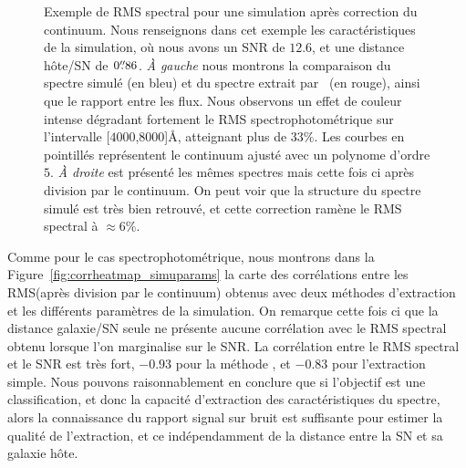 \documentclass[../main/main.tex]{subfiles}
\begin{document}
\begin{figure}[ht]
  \centering
  \caption[Exemple de RMS spectral pour une simulation après correction
  du continuum.]{Exemple de RMS spectral pour une simulation après
    correction du continuum. Nous renseignons dans cet exemple les
    caractéristiques de la simulation, où nous avons un SNR de $12.6$,
    et une distance hôte/SN de $0\overset{\prime\prime}{.}86$. \emph{À gauche} nous
    montrons la comparaison du spectre simulé (en bleu) et du spectre
    extrait par \hypergal\ (en rouge), ainsi que le rapport entre les flux. Nous observons un effet de
    couleur intense dégradant fortement le RMS spectrophotométrique sur
    l'intervalle [$4000$,$8000$]\AA, atteignant plus de $33\%$. Les
    courbes en pointillés représentent le continuum ajusté avec un
    polynome d'ordre $5$. \emph{À droite} est présenté les mêmes
    spectres mais cette fois ci après division par le continuum. On peut
    voir que la
    structure du spectre simulé est très bien retrouvé, et cette
    correction ramène le RMS spectral à $\approx6\%$.}
  \label{fig:continuumcorrection_ex}
\end{figure}

Comme pour le cas spectrophotométrique, nous montrons dans la
Figure~\ref{fig:corrheatmap_simuparams} la carte des corrélations entre
les RMS(après division par le continuum) obtenus avec deux méthodes d'extraction et les différents paramètres de
la simulation. On remarque cette fois ci que la distance galaxie/SN
seule ne présente aucune corrélation avec le RMS spectral obtenu lorsque
l'on marginalise sur le SNR. La corrélation entre le RMS spectral et le
SNR est très fort, $-0.93$ pour la méthode \hypergal, et $-0.83$ pour
l'extraction simple. Nous pouvons raisonnablement en conclure que si l'objectif
est une classification, et donc la capacité 
d'extraction des caractéristiques du spectre, alors la connaissance du rapport signal sur
bruit est suffisante pour estimer la qualité de l'extraction, et ce
indépendamment de la distance entre la SN et sa galaxie hôte.
 
\end{document}

